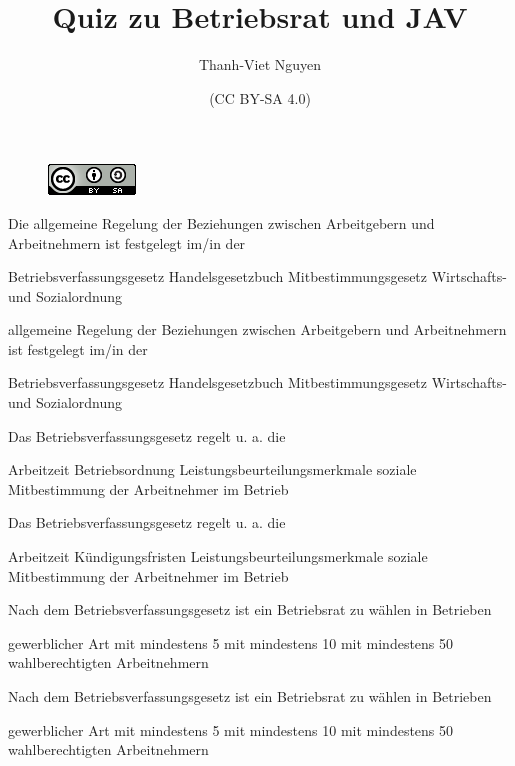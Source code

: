 \documentclass{exam}
\title{Quiz zu Betriebsrat und JAV }
\author{Thanh-Viet Nguyen}
\date{(CC BY-SA 4.0)}
\begin{document}
\maketitle
\begin{figure} [h]
	\centering 
	\includegraphics[width=0.1\linewidth]{img/88x31.png}
\end{figure}
\begin{center}	
	\begin{questions}
		\question Die allgemeine Regelung der Beziehungen zwischen Arbeitgebern und Arbeitnehmern ist festgelegt im/in der
		\begin{checkboxes}
			\choice Betriebsverfassungsgesetz 
			\choice Handelsgesetzbuch 
			\choice Mitbestimmungsgesetz  
			\choice  Wirtschafts- und Sozialordnung
		\end{checkboxes}
		\newpage
		\printanswers
		allgemeine Regelung der Beziehungen zwischen Arbeitgebern und Arbeitnehmern ist festgelegt im/in der
		\begin{checkboxes}
			\CorrectChoice Betriebsverfassungsgesetz 
			\choice Handelsgesetzbuch 
			\choice Mitbestimmungsgesetz  
			\choice Wirtschafts- und Sozialordnung
		\end{checkboxes}
		
		\question  Das Betriebsverfassungsgesetz regelt u. a. die
		\begin{checkboxes}
			\choice Arbeitzeit
			\choice Betriebsordnung 
			\choice Leistungsbeurteilungsmerkmale
			\choice soziale Mitbestimmung der Arbeitnehmer im Betrieb
		\end{checkboxes}
		\newpage
		\printanswers 
		Das Betriebsverfassungsgesetz regelt u. a. die
		\begin{checkboxes}
			\choice Arbeitzeit
			\choice Kündigungsfristen
			\choice Leistungsbeurteilungsmerkmale
			\CorrectChoice soziale Mitbestimmung der Arbeitnehmer im Betrieb
		\end{checkboxes}

		\question Nach dem Betriebsverfassungsgesetz ist ein Betriebsrat zu wählen in Betrieben
		\begin{checkboxes}
		\choice gewerblicher Art
		\choice mit mindestens 5
		\choice mit mindestens 10
		\choice mit mindestens 50 wahlberechtigten Arbeitnehmern
		\end{checkboxes}
		\newpage
		\printanswers
		Nach dem Betriebsverfassungsgesetz ist ein Betriebsrat zu wählen in Betrieben
		\begin{checkboxes}
			\choice gewerblicher Art
			\CorrectChoice mit mindestens 5
			\choice mit mindestens 10
			\choice mit mindestens 50 wahlberechtigten Arbeitnehmern
		\end{checkboxes}
		

\end{questions}
\end{center}
\end{document}
